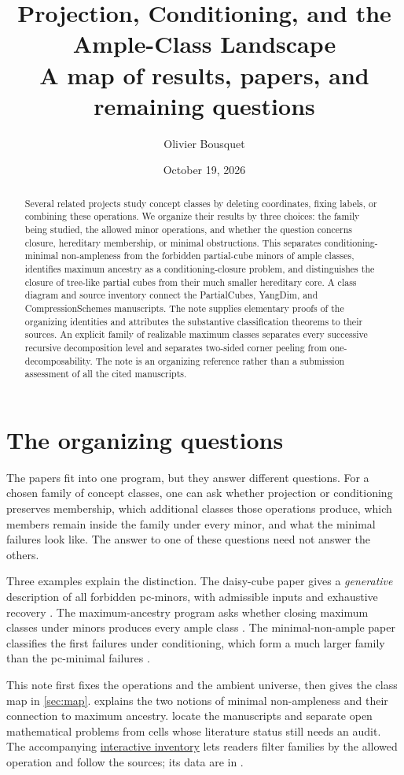 \documentclass[11pt]{article}
\title{Projection, Conditioning, and the Ample-Class Landscape\\
\large A map of results, papers, and remaining questions}
\author{Olivier Bousquet}
\date{October 19, 2026}
\theoremstyle{definition}
\begin{document}
\maketitle
\begin{abstract}
Several related projects study concept classes by deleting coordinates,
fixing labels, or combining these operations. We organize their results by
three choices: the family being studied, the allowed minor operations, and
whether the question concerns closure, hereditary membership, or minimal
obstructions. This separates conditioning-minimal non-ampleness from the
forbidden partial-cube minors of ample classes, identifies maximum ancestry
as a conditioning-closure problem, and distinguishes the closure of tree-like
partial cubes from their much smaller hereditary core. A class diagram and
source inventory connect the PartialCubes, YangDim, and CompressionSchemes
manuscripts. The note supplies elementary proofs of the organizing identities
and attributes the substantive classification theorems to their sources.
An explicit family of realizable maximum classes separates every successive
recursive decomposition level and separates two-sided corner peeling from
one-decomposability. The note is an organizing reference rather than a
submission assessment of all the cited manuscripts.
\end{abstract}

\section{The organizing questions}

The papers fit into one program, but they answer different questions.
For a chosen family of concept classes, one can ask whether projection or
conditioning preserves membership, which additional classes those operations
produce, which members remain inside the family under every minor, and what
the minimal failures look like. The answer to one of these questions need
not answer the others.

Three examples explain the distinction. The daisy-cube paper gives a
\emph{generative} description of all forbidden pc-minors, with admissible
inputs and exhaustive recovery \cite{Daisy}. The maximum-ancestry program
asks whether closing maximum classes under minors produces every ample class
\cite{Partition}. The minimal-non-ample paper classifies the first failures
under conditioning, which form a much larger family than the pc-minimal
failures \cite{MNA}.

This note first fixes the operations and the ambient universe, then gives
the class map in \cref{sec:map}.  explains the two
notions of minimal non-ampleness and their connection to maximum ancestry.
 locate the manuscripts and separate open
mathematical problems from cells whose literature status still needs an audit.
The accompanying \href{https://research.obousquet.uk/repos/PartialCubes/papers/minor-atlas/inventory.html}{interactive inventory}
lets readers filter families by the allowed operation and follow the sources;
its data are in .
\end{document}
